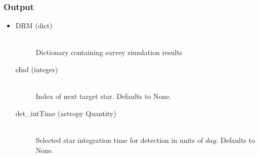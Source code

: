\documentclass[cleanfoot]{asme2ej}
\begin{document}
\subsubsection*{Output}
\begin{itemize}
\item 
\begin{description}
    \item[DRM (dict)] \hfill \\ Dictionary containing survey simulation results
    \item[sInd (integer)] \hfill \\ Index of next target star. Defaults to None.
    \item[det\_intTime (astropy Quantity)] \hfill \\ Selected star integration time for detection in units of $day$. Defaults to None.
\end{description}
\end{itemize}
\end{document}
